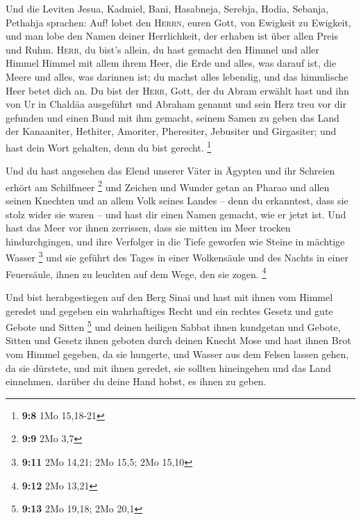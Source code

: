  Und die Leviten Jesua, Kadmiel, Bani, Hasabneja, Serebja,
Hodia, Sebanja, Pethahja sprachen: Auf! lobet den \textsc{Herrn}, euren
Gott, von Ewigkeit zu Ewigkeit, und man lobe den Namen deiner
Herrlichkeit, der erhaben ist über allen Preis und Ruhm. 
\textsc{Herr}, du bist's allein, du hast gemacht den Himmel und aller
Himmel Himmel mit allem ihrem Heer, die Erde und alles, was darauf ist,
die Meere und alles, was darinnen ist; du machst alles lebendig, und das
himmlische Heer betet dich an.  Du bist der \textsc{Herr},
Gott, der du Abram erwählt hast und ihn von Ur in Chaldäa ausgeführt und
Abraham genannt  und sein Herz treu vor dir gefunden und
einen Bund mit ihm gemacht, seinem Samen zu geben das Land der
Kanaaniter, Hethiter, Amoriter, Pheresiter, Jebusiter und Girgasiter;
und hast dein Wort gehalten, denn du bist gerecht. \footnote{\textbf{9:8}
  1Mo 15,18-21}

 Und du hast angesehen das Elend unserer Väter in Ägypten
und ihr Schreien erhört am Schilfmeer \footnote{\textbf{9:9} 2Mo 3,7}
 und Zeichen und Wunder getan an Pharao und allen seinen
Knechten und an allem Volk seines Landes -- denn du erkanntest, dass sie
stolz wider sie waren -- und hast dir einen Namen gemacht, wie er jetzt
ist.  Und hast das Meer vor ihnen zerrissen, dass sie
mitten im Meer trocken hindurchgingen, und ihre Verfolger in die Tiefe
geworfen wie Steine in mächtige Wasser \footnote{\textbf{9:11} 2Mo
  14,21; 2Mo 15,5; 2Mo 15,10}  und sie geführt des Tages
in einer Wolkensäule und des Nachts in einer Feuersäule, ihnen zu
leuchten auf dem Wege, den sie zogen. \footnote{\textbf{9:12} 2Mo 13,21}

 Und bist herabgestiegen auf den Berg Sinai und hast mit
ihnen vom Himmel geredet und gegeben ein wahrhaftiges Recht und ein
rechtes Gesetz und gute Gebote und Sitten \footnote{\textbf{9:13} 2Mo
  19,18; 2Mo 20,1}  und deinen heiligen Sabbat ihnen
kundgetan und Gebote, Sitten und Gesetz ihnen geboten durch deinen
Knecht Mose  und hast ihnen Brot vom Himmel gegeben, da
sie hungerte, und Wasser aus dem Felsen lassen gehen, da sie dürstete,
und mit ihnen geredet, sie sollten hineingehen und das Land einnehmen,
darüber du deine Hand hobst, es ihnen zu geben.

